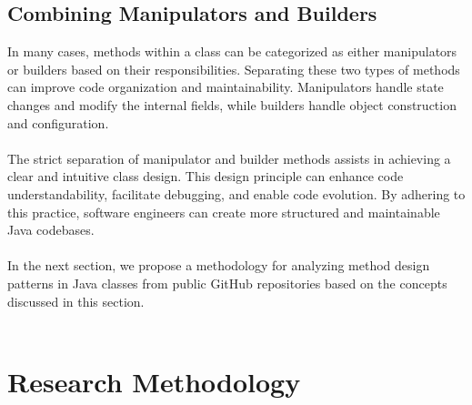 \documentclass[draft]{article}
\begin{document}
\subsection{Combining Manipulators and Builders}
In many cases, methods within a class can be categorized as either manipulators or builders based on their responsibilities. Separating these two types of methods can improve code organization and maintainability. Manipulators handle state changes and modify the internal fields, while builders handle object construction and configuration.\\
~\\
The strict separation of manipulator and builder methods assists in achieving a clear and intuitive class design. This design principle can enhance code understandability, facilitate debugging, and enable code evolution. By adhering to this practice, software engineers can create more structured and maintainable Java codebases.\\
~\\
In the next section, we propose a methodology for analyzing method design patterns in Java classes from public GitHub repositories based on the concepts discussed in this section.\\
~\\

\newpage
\section{Research Methodology}
\end{document}
